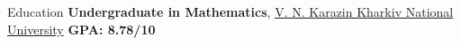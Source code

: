 \begin{cvsection}{Education}
    {\bf Undergraduate in Mathematics}, \href{https://univer.kharkov.ua/en}{V. N. Karazin Kharkiv National University} \hfill \textbf{GPA: 8.78/10} 
\end{cvsection}
